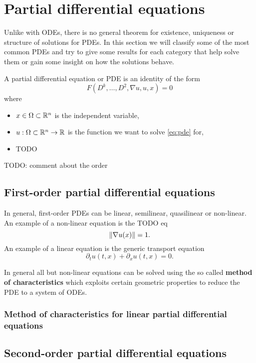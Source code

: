 \chapter{Partial differential equations}

Unlike with ODEs, there is no general theorem for existence, uniqueness or
structure of solutions for PDEs. In this section we will classify some of the
most common PDEs and try to give some results for each category that help solve
them or gain some insight on how the solutions behave.

\begin{dfn}
  A partial differential equation or PDE is an identity of the form
  \begin{equation}
    \label{eq:pde}
    F(D^k, \dots, D^2, \nabla u, u, x) = 0
  \end{equation}
  where
  \begin{itemize}
    \item $x \in \Omega \subset \mathbb{R}^n$ is the independent variable,
    \item $u : \Omega \subset \mathbb{R}^n \to \mathbb{R}$ is the function we want to solve
      \eqref{eq:pde} for,
    \item TODO
  \end{itemize}

  TODO: comment about the order
\end{dfn}


\section{First-order partial differential equations}

In general, first-order PDEs can be linear, semilinear, quasilinear or
non-linear. An example of a non-linear equation is the TODO eq
\[
  \left\Vert{\nabla u(x)}\right\Vert = 1.
\]
An example of a linear equation is the generic transport equation
\[
  \partial_t u(t, x) + \partial_x u(t, x) = 0.
\]

In general all but non-linear equations can be solved using the so called
\textbf{method of characteristics} which exploits certain geometric properties
to reduce the PDE to a system of ODEs.

\subsection{Method of characteristics for linear partial differential equations}

\section{Second-order partial differential equations}

